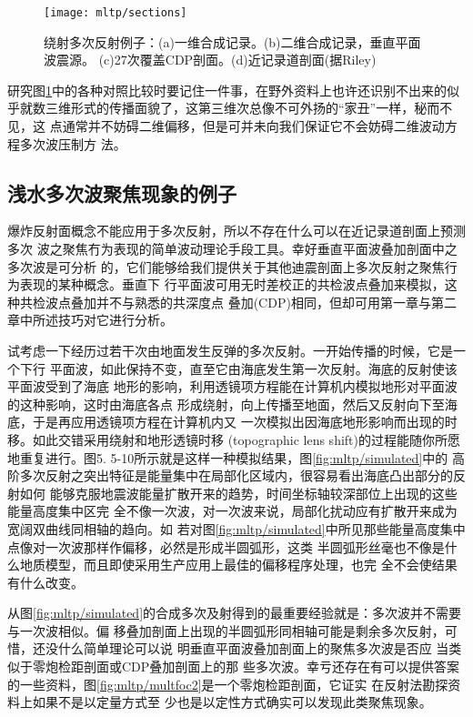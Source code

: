 \begin{figure}[H]
\centering
\texttt{[image: mltp/sections]}
\caption[sections]{
绕射多次反射例子：(a)一维合成记录。(b)二维合成记录，垂直平面波震源。
(c)27次覆盖CDP剖面。(d)近记录道剖面(据Riley)
}
\label{fig:mltp/sections}
\end{figure}

研究图\ref{fig:mltp/sections}中的各种对照比较时要记住一件事，在野外资料上也许还识别不出来的似
乎就数三维形式的传播面貌了，这第三维次总像不可外扬的“家丑”一样，秘而不见，这
点通常并不妨碍二维偏移，但是可并未向我们保证它不会妨碍二维波动方程多次波压制方
法。

\subsection{浅水多次波聚焦现象的例子}
\label{sec:5.5.7}

爆炸反射面概念不能应用于多次反射，所以不存在什么可以在近记录道剖面上预测多次
波之聚焦冇为表现的简单波动理论手段工具。幸好垂直平面波叠加剖面中之多次波是可分析
的，它们能够给我们提供关于其他迪震剖面上多次反射之聚焦行为表现的某种概念。垂直下
行平面波可用无时差校正的共检波点叠加来模拟，这种共检波点叠加并不与熟悉的共深度点
叠加(CDP)相同，但却可用第一章与第二章中所述技巧对它进行分析。

试考虑一下经历过若干次由地面发生反弹的多次反射。一开始传播的时候，它是一个下行
平面波，如此保持不变，直至它由海底发生第一次反射。海底的反射使该平面波受到了海底
地形的影响，利用透镜项方程能在计算机内模拟地形对平面波的这种影响，这时由海底各点
形成绕射，向上传播至地面，然后又反射向下至海底，于是再应用透镜项方程在计算机内又
一次模拟出因海底地形影响而出现的时移。如此交错采用绕射和地形透镜时移
(topographic lens shift)的过程能随你所愿地重复进行。图5.
5-10所示就是这样一种模拟结果，图\ref{fig:mltp/simulated}中的
高阶多次反射之突出特征是能量集中在局部化区域内，很容易看出海底凸出部分的反射如何
能够克服地震波能量扩散开来的趋势，时间坐标轴较深部位上出现的这些能量高度集中区完
全不像一次波，对一次波来说，局部化扰动应有扩散开来成为宽阔双曲线同相轴的趋向。如
若对图\ref{fig:mltp/simulated}中所见那些能量高度集中点像对一次波那样作偏移，必然是形成半圆弧形，这类
半圆弧形丝毫也不像是什么地质模型，而且即使采用生产应用上最佳的偏移程序处理，也完
全不会使结果有什么改变。

从图\ref{fig:mltp/simulated}的合成多次及射得到的最重要经验就是：多次波并不需要与一次波相似。偏
移叠加剖面上出现的半圆弧形同相轴可能是剩余多次反射，可惜，还没什么简单理论可以说
明垂直平面波叠加剖面上的聚焦多次波是否应
当类似于零炮检距剖面或CDP叠加剖面上的那
些多次波。幸亏还存在有可以提供答案的一些资料，图\ref{fig:mltp/multfoc2}是一个零炮检距剖面，它证实 在反射法勘探资料上如果不是以定量方式至
少也是以定性方式确实可以发现此类聚焦现象。

